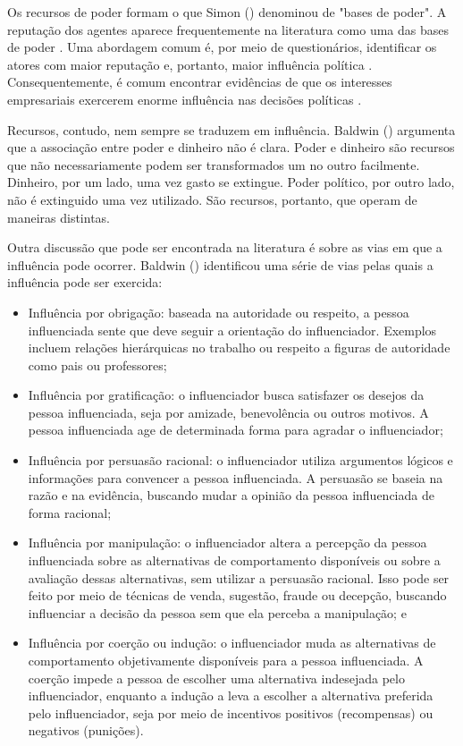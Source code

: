     Os recursos de poder formam o que Simon (\citeyear{simon_notes_1953}) denominou de "bases de poder". A reputação dos agentes aparece frequentemente na literatura como uma das bases de poder \cite{Ibenskas2021, simon_notes_1953}. Uma abordagem comum é, por meio de questionários, identificar os atores com maior reputação e, portanto, maior influência política \cite{thomas2004interest}. Consequentemente, é comum encontrar evidências de que os interesses empresariais exercerem enorme influência nas decisões políticas \cite{schlozman1986organized, schlozman1984accent}.

    Recursos, contudo, nem sempre se traduzem em influência. Baldwin (\citeyear{baldwin1971money}) argumenta que a associação entre poder e dinheiro não é clara. Poder e dinheiro são recursos que não necessariamente podem ser transformados um no outro facilmente. Dinheiro, por um lado, uma vez gasto se extingue. Poder político, por outro lado, não é extinguido uma vez utilizado. São recursos, portanto, que operam de maneiras distintas.

Outra discussão que pode ser encontrada na literatura é sobre as vias em que a influência pode ocorrer. Baldwin (\citeyear{banfield1961}) identificou uma série de vias pelas quais a influência pode ser exercida:
\begin{itemize}
    \item Influência por obrigação: baseada na autoridade ou respeito, a pessoa influenciada sente que deve seguir a orientação do influenciador. Exemplos incluem relações hierárquicas no trabalho ou respeito a figuras de autoridade como pais ou professores;
    \item Influência por gratificação: o influenciador busca satisfazer os desejos da pessoa influenciada, seja por amizade, benevolência ou outros motivos. A pessoa influenciada age de determinada forma para agradar o influenciador;
    \item Influência por persuasão racional: o influenciador utiliza argumentos lógicos e informações para convencer a pessoa influenciada. A persuasão se baseia na razão e na evidência, buscando mudar a opinião da pessoa influenciada de forma racional;
    \item Influência por manipulação: o influenciador altera a percepção da pessoa influenciada sobre as alternativas de comportamento disponíveis ou sobre a avaliação dessas alternativas, sem utilizar a persuasão racional. Isso pode ser feito por meio de técnicas de venda, sugestão, fraude ou decepção, buscando influenciar a decisão da pessoa sem que ela perceba a manipulação; e
    \item Influência por coerção ou indução: o influenciador muda as alternativas de comportamento objetivamente disponíveis para a pessoa influenciada. A coerção impede a pessoa de escolher uma alternativa indesejada pelo influenciador, enquanto a indução a leva a escolher a alternativa preferida pelo influenciador, seja por meio de incentivos positivos (recompensas) ou negativos (punições).
\end{itemize}


